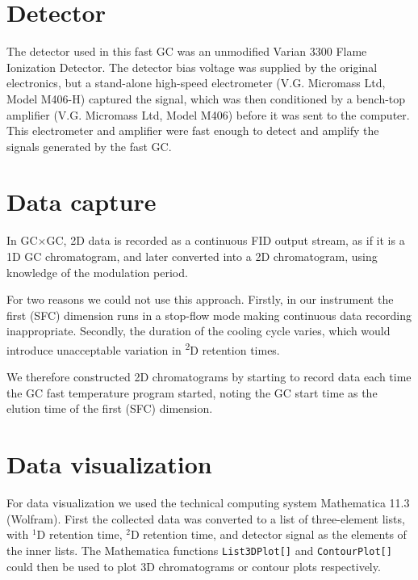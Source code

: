 \section{Detector}

The detector used in this fast GC was an unmodified Varian\texttrademark{} 3300
Flame Ionization Detector. The detector bias voltage was supplied by the
original electronics, but a stand-alone high-speed electrometer (V.G. Micromass
Ltd, Model M406-H) captured the signal, which was then conditioned by a
bench-top amplifier (V.G. Micromass Ltd, Model M406) before it was sent to the
computer. This electrometer and amplifier were fast enough to detect and amplify the signals generated by the fast GC. 

\section{Data capture}

In GC$\times$GC, 2D data is recorded as a continuous FID output stream, as if it
is a 1D GC chromatogram, and later converted into a 2D chromatogram, using
knowledge of the modulation period.

For two reasons we could not use this approach. Firstly, in our instrument the
first (SFC) dimension runs in a stop-flow mode making continuous data recording
inappropriate. Secondly, the duration of the cooling cycle varies, which would
introduce unacceptable variation in \textsuperscript{2}D retention times.

We therefore constructed 2D chromatograms by starting to record data each time
the GC fast temperature program started, noting the GC start time as the elution
time of the first (SFC) dimension.

\section{Data visualization}
For data visualization we used the technical computing system Mathematica
11.3\texttrademark{} (Wolfram).  First the collected data was converted to a
list of three-element lists, with $^1$D retention time, $^2$D retention time,
and detector signal as the elements of the inner lists. The Mathematica
functions \texttt{List3DPlot[]} and \texttt{ContourPlot[]} could then be used to
plot 3D chromatograms or contour plots respectively.


\todos

